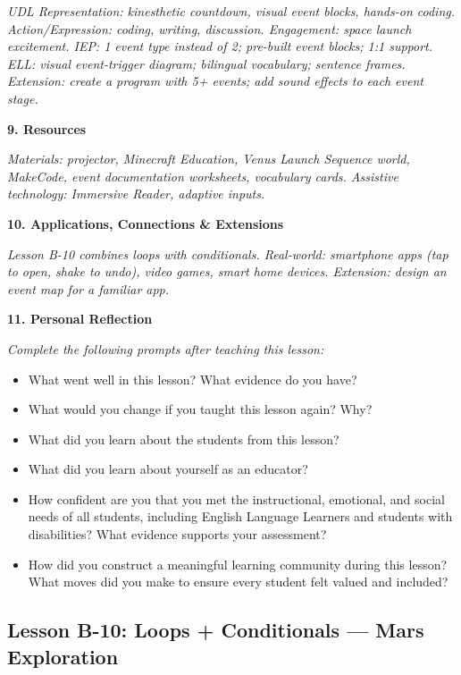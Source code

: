 \documentclass[11pt,letterpaper]{article}
\begin{document}
\textit{UDL Representation: kinesthetic countdown, visual event blocks, hands-on coding. Action/Expression: coding, writing, discussion. Engagement: space launch excitement. IEP: 1 event type instead of 2; pre-built event blocks; 1:1 support. ELL: visual event-trigger diagram; bilingual vocabulary; sentence frames. Extension: create a program with 5+ events; add sound effects to each event stage.}

\textbf{9. Resources}

\textit{Materials: projector, Minecraft Education, Venus Launch Sequence world, MakeCode, event documentation worksheets, vocabulary cards. Assistive technology: Immersive Reader, adaptive inputs.}

\textbf{10. Applications, Connections \& Extensions}

\textit{Lesson B-10 combines loops with conditionals. Real-world: smartphone apps (tap to open, shake to undo), video games, smart home devices. Extension: design an event map for a familiar app.}

\textbf{11. Personal Reflection}

\textit{Complete the following prompts after teaching this lesson:}

\begin{itemize}
  \item What went well in this lesson? What evidence do you have?

  \item What would you change if you taught this lesson again? Why?

  \item What did you learn about the students from this lesson?

  \item What did you learn about yourself as an educator?

  \item How confident are you that you met the instructional, emotional, and social needs of all students, including English Language Learners and students with disabilities? What evidence supports your assessment?

  \item How did you construct a meaningful learning community during this lesson? What moves did you make to ensure every student felt valued and included?
\end{itemize}

\newpage
\subsection{Lesson B-10: Loops + Conditionals --- Mars Exploration}
\label{sub:LessonB10LoopsConditionalsMarsExploration}
\end{document}
